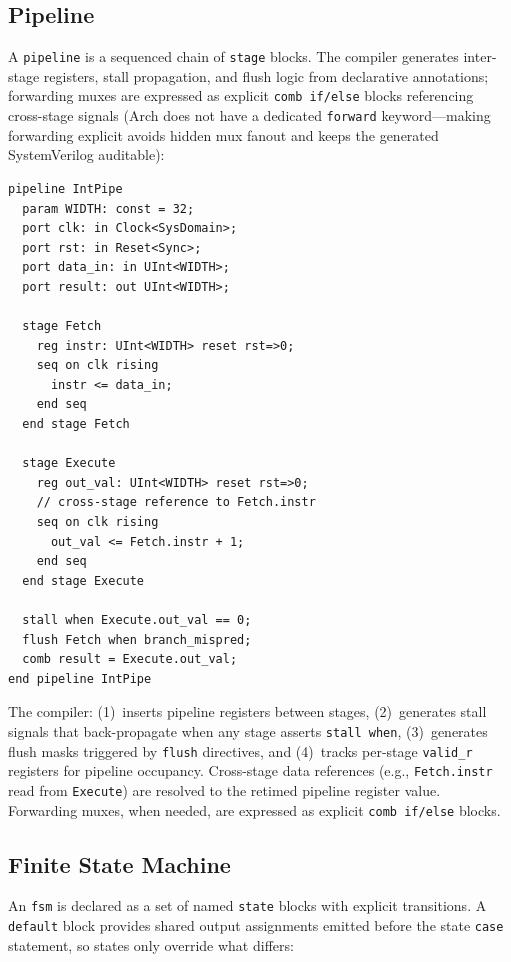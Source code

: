 \documentclass[11pt,twocolumn]{article}
\begin{document}
\subsection{Pipeline}

A \texttt{pipeline} is a sequenced chain of \texttt{stage} blocks. The compiler generates inter-stage registers, stall propagation, and flush logic from declarative annotations; forwarding muxes are expressed as explicit \texttt{comb if/else} blocks referencing cross-stage signals (Arch does not have a dedicated \texttt{forward} keyword---making forwarding explicit avoids hidden mux fanout and keeps the generated SystemVerilog auditable):

\begin{lstlisting}[language=Arch,caption={Pipeline with forwarding},label={lst:pipe}]
pipeline IntPipe
  param WIDTH: const = 32;
  port clk: in Clock<SysDomain>;
  port rst: in Reset<Sync>;
  port data_in: in UInt<WIDTH>;
  port result: out UInt<WIDTH>;

  stage Fetch
    reg instr: UInt<WIDTH> reset rst=>0;
    seq on clk rising
      instr <= data_in;
    end seq
  end stage Fetch

  stage Execute
    reg out_val: UInt<WIDTH> reset rst=>0;
    // cross-stage reference to Fetch.instr
    seq on clk rising
      out_val <= Fetch.instr + 1;
    end seq
  end stage Execute

  stall when Execute.out_val == 0;
  flush Fetch when branch_mispred;
  comb result = Execute.out_val;
end pipeline IntPipe
\end{lstlisting}

The compiler:
(1)~inserts pipeline registers between stages,
(2)~generates stall signals that back-propagate when any stage asserts \texttt{stall when},
(3)~generates flush masks triggered by \texttt{flush} directives, and
(4)~tracks per-stage \texttt{valid\_r} registers for pipeline occupancy.
Cross-stage data references (e.g., \texttt{Fetch.instr} read from \texttt{Execute}) are resolved to the retimed pipeline register value. Forwarding muxes, when needed, are expressed as explicit \texttt{comb if/else} blocks.

\subsection{Finite State Machine}

An \texttt{fsm} is declared as a set of named \texttt{state} blocks with explicit transitions. A \texttt{default} block provides shared output assignments emitted before the state \texttt{case} statement, so states only override what differs:
\end{document}
